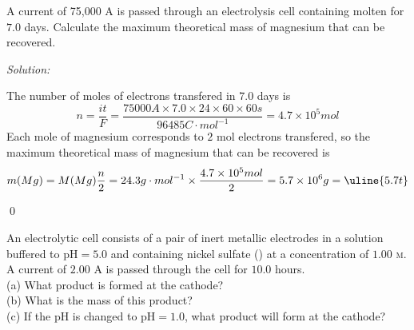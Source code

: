 \documentclass[12pt]{article}
\newenvironment{problem}[2][Problem]{\begin{trivlist}
\item[\hskip \labelsep {\bfseries #1}\hskip \labelsep {\bfseries #2.}]}{\end{trivlist}}
\newenvironment{sol}
    {\emph{Solution:}
    }
    {
    \qed
    }
\begin{document}
\begin{problem}{17.66}
A current of 75,000 A is passed through an electrolysis cell containing molten  for $7.0$ days. Calculate the maximum theoretical mass of magnesium that can be recovered.
\end{problem}
\begin{sol}
The number of moles of electrons transfered in $7.0$ days is
\[
n=\frac{it}{F}=\frac{75000A\times7.0\times24\times60\times60s}{96485C\cdot mol^{-1}}=4.7\times10^5mol
\]
Each mole of magnesium corresponds to $2$ mol electrons transfered, so the maximum theoretical mass of magnesium that can be recovered is
\[
m(Mg)=M(Mg)\frac{n}{2}=24.3g\cdot mol^{-1}\times\frac{4.7\times10^5mol}{2}=5.7\times10^6g=\uline{5.7t}
\]
\end{sol}

\begin{problem}{17.71}
An electrolytic cell consists of a pair of inert metallic electrodes in a solution buffered to pH$=5.0$ and containing nickel sulfate () at a concentration of $1.00$ \textsc{m}. A current of $2.00$ A is passed through the cell for $10.0$ hours.\\
(a) What product is formed at the cathode?\\
(b) What is the mass of this product?\\
(c) If the pH is changed to pH$=1.0$, what product will form at the cathode?
\end{problem}
\end{document}
